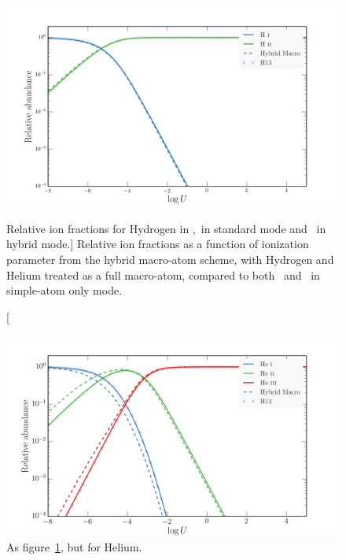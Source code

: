 \begin{figure}
\centering
\includegraphics[width=1.0\textwidth]{figures/03-radtrans/hy_comp.png}
\caption
[Relative ion fractions for Hydrogen in \cld,\py\ in standard mode and 
\py\ in hybrid mode.]
{
Relative ion fractions as a function of ionization parameter from the
hybrid macro-atom scheme, with Hydrogen and Helium 
treated as a full macro-atom, compared
to both \cld\ and \py\ in simple-atom only mode.  
}
\label{fig:h_cloudy}
\end{figure}

\begin{figure}
\centering
\includegraphics[width=1.0\textwidth]{figures/03-radtrans/he_comp.png}
\caption{
As figure~\ref{fig:h_cloudy}, but for Helium.
}
\label{fig:he_cloudy}
\end{figure}

